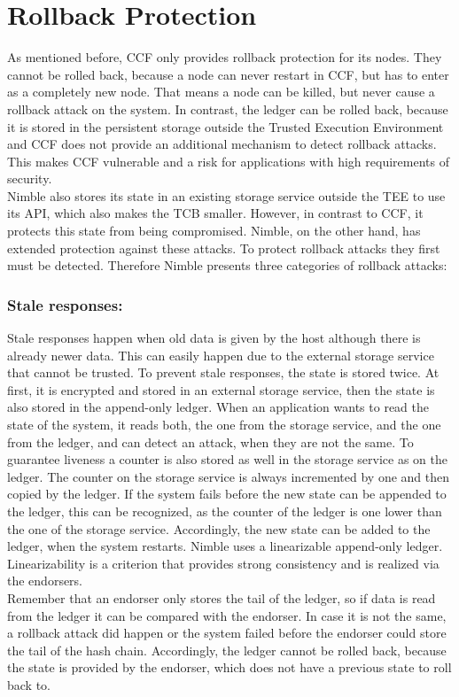 \section{Rollback Protection}
As mentioned before, CCF only provides rollback protection for its nodes. They cannot be rolled back, because a node can never restart in CCF, but has to enter as a completely new node. That means a node can be killed, but never cause a rollback attack on the system. In contrast, the ledger can be rolled back, because it is stored in the persistent storage outside the Trusted Execution Environment and CCF does not provide an additional mechanism to detect rollback attacks. This makes CCF vulnerable and a risk for applications with high requirements of security.\\
 Nimble also stores its state in an existing storage service outside the TEE to use its API, which also makes the TCB smaller. However, in contrast to CCF, it protects this state from being compromised. Nimble, on the other hand, has extended protection against these attacks. To protect rollback attacks they first must be detected. Therefore Nimble presents three categories of rollback attacks:
	\subsubsection*{Stale responses:} Stale responses happen when old data is given by the host although there is already newer data. This can easily happen due to the external storage service that cannot be trusted. To prevent stale responses, the state is stored twice. At first, it is encrypted and stored in an external storage service, then the state is also stored in the append-only ledger. When an application wants to read the state of the system, it reads both, the one from the storage service, and the one from the ledger, and can detect an attack, when they are not the same. To guarantee liveness a counter is also stored as well in the storage service as on the ledger. The counter on the storage service is always incremented by one and then copied by the ledger. If the system fails before the new state can be appended to the ledger, this can be recognized, as the counter of the ledger is one lower than the one of the storage service. Accordingly, the new state can be added to the ledger, when the system restarts. Nimble uses a linearizable append-only ledger. Linearizability is a criterion that provides strong consistency and is realized via the endorsers.\\
	 Remember that an endorser only stores the tail of the ledger, so if data is read from the ledger it can be compared with the endorser. In case it is not the same, a rollback attack did happen or the system failed before the endorser could store the tail of the hash chain. Accordingly, the ledger cannot be rolled back, because the state is provided by the endorser, which does not have a previous state to roll back to. 
